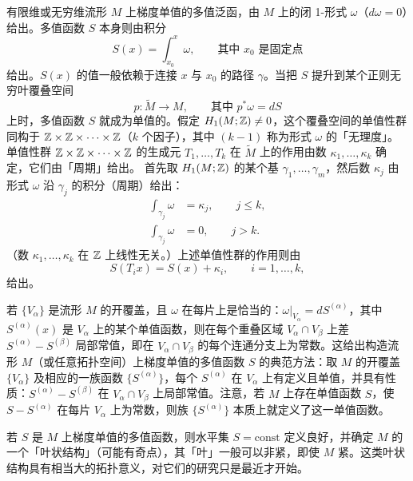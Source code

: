 有限维或无穷维流形 $M$ 上梯度单值的多值泛函，由 $M$ 上的闭 1-形式 $\omega$（$d\omega=0$）给出。多值函数 $S$ 本身则由积分
\[
  S(x)=\int_{x_0}^x\omega,\qquad\text{其中 }x_0\text{ 是固定点}
\]
给出。$S(x)$ 的值一般依赖于连接 $x$ 与 $x_0$ 的路径 $\gamma$。当把 $S$ 提升到某个正则无穷叶覆叠空间
\begin{equation}
  p:\tilde M\to M,\qquad\text{其中 }p^*\omega=dS \tag{2.50}
\end{equation}
上时，多值函数 $S$ 就成为单值的。假定 $H_1(M;\mathbb{Z})\ne0$，这个覆叠空间的单值性群同构于 $\mathbb{Z}\times\mathbb{Z}\times\cdots\times\mathbb{Z}$（$k$ 个因子），其中 $(k-1)$ 称为形式 $\omega$ 的「无理度」。单值性群 $\mathbb{Z}\times\mathbb{Z}\times\cdots\times\mathbb{Z}$ 的生成元 $T_1,\dots,T_k$ 在 $\tilde M$ 上的作用由数 $\kappa_1,\dots,\kappa_k$ 确定，它们由「周期」给出。
首先取 $H_1(M;\mathbb{Z})$ 的某个基 $\gamma_1,\dots,\gamma_m$，然后数 $\kappa_j$ 由形式 $\omega$ 沿 $\gamma_j$ 的积分（周期）给出：
\begin{equation}
\begin{aligned}
  \int_{\gamma_j}\omega&=\kappa_j,\qquad j\le k,\\
  \int_{\gamma_j}\omega&=0,\qquad j>k.
\end{aligned}\tag{2.51}
\end{equation}
（数 $\kappa_1,\dots,\kappa_k$ 在 $\mathbb{Z}$ 上线性无关。）上述单值性群的作用则由
\begin{equation}
  S(T_ix)=S(x)+\kappa_i,\qquad i=1,\dots,k, \tag{2.52}
\end{equation}
给出。

若 $\{V_\alpha\}$ 是流形 $M$ 的开覆盖，且 $\omega$ 在每片上是恰当的：$\omega|_{V_\alpha}=dS^{(\alpha)}$，其中 $S^{(\alpha)}(x)$ 是 $V_\alpha$ 上的某个单值函数，则在每个重叠区域 $V_\alpha\cap V_\beta$ 上差 $S^{(\alpha)}-S^{(\beta)}$ 局部常值，即在 $V_\alpha\cap V_\beta$ 的每个连通分支上为常数。这给出构造流形 $M$（或任意拓扑空间）上梯度单值的多值函数 $S$ 的典范方法：取 $M$ 的开覆盖 $\{V_\alpha\}$ 及相应的一族函数 $\{S^{(\alpha)}\}$，每个 $S^{(\alpha)}$ 在 $V_\alpha$ 上有定义且单值，并具有性质：$S^{(\alpha)}-S^{(\beta)}$ 在 $V_\alpha\cap V_\beta$ 上局部常值。注意，若 $M$ 上存在单值函数 $S$，使 $S-S^{(\alpha)}$ 在每片 $V_\alpha$ 上为常数，则族 $\{S^{(\alpha)}\}$ 本质上就定义了这一单值函数。

若 $S$ 是 $M$ 上梯度单值的多值函数，则水平集 $S=\mathrm{const}$ 定义良好，并确定 $M$ 的一个「叶状结构」（可能有奇点），其「叶」一般可以非紧，即使 $M$ 紧。这类叶状结构具有相当大的拓扑意义，对它们的研究只是最近才开始。

